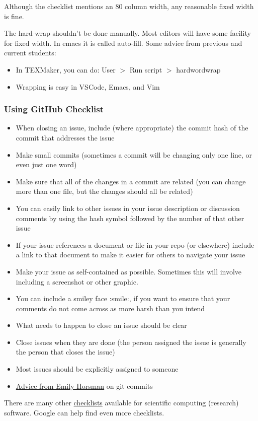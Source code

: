 \documentclass[12pt]{article}
\begin{document}
Although the checklist mentions an 80 column width, any reasonable fixed width
is fine.

The hard-wrap shouldn't be done manually.  Most editors will have some facility
for fixed width.  In emacs it is called auto-fill.  Some advice from previous
and current students:

\begin{itemize}
\item In TEXMaker, you can do: User $>$ Run script $>$ hardwordwrap
\item Wrapping is easy in VSCode, Emacs, and Vim
\end{itemize}

\subsubsection*{Using GitHub Checklist}

\begin{itemize}
\item When closing an issue, include (where appropriate) the commit hash of the
  commit that addresses the issue
\item Make small commits (sometimes a commit will be changing only one line, or
  even just one word)
\item Make sure that all of the changes in a commit are related (you can change
  more than one file, but the changes should all be related)
\item You can easily link to other issues in your issue description or
  discussion comments by using the hash symbol followed by the number
  of that other issue
\item If your issue references a document or file in your repo (or elsewhere)
include a link to that document to make it easier for others to navigate your
issue
\item Make your issue as self-contained as possible.  Sometimes this will
involve including a screenshot or other graphic.
\item You can include a smiley face :smile:, if you want to ensure that your
  comments do not come across as more harsh than you intend
\item What needs to happen to close an issue should be clear
\item Close issues when they are done (the person assigned the issue is
  generally the person that closes the issue)
\item Most issues should be explicitly assigned to someone
\item 
  \href{https://gitlab.cas.mcmaster.ca/smiths/se2aa4_cs2me3/-/blob/master/FAQ/GitAdvice.txt}
  {Advice from Emily Horsman} on git commits
\end{itemize}

There are many other
\href{https://gitlab.cas.mcmaster.ca/SEforSC/se4sc/-/wikis/Advice-and-Checklists-for-Repos-(including-a-list-of-recommended-artifacts)}{checklists}
available for scientific computing (research) software.  Google can help find
even more checklists.
\end{document}

